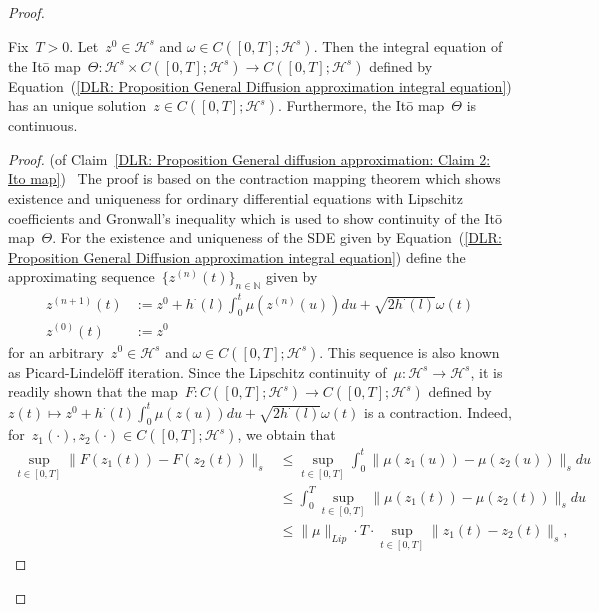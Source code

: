 \begin{proof}
  \begin{claim}
    \label{DLR: Proposition General diffusion approximation: Claim 2: Ito map}
  Fix~$T>0$. Let~$z^0 \in \mathcal{H}^s$ and $\omega \in C([0,T];\mathcal{H}^s)$. Then the integral equation of the It\={o} map~$\Theta : \mathcal{H}^s \times C([0,T]; \mathcal{H}^s) \to  C([0,T]; \mathcal{H}^s)$ defined by Equation~(\ref{DLR: Proposition General Diffusion approximation integral equation}) has an unique solution~$z \in C([0,T];\mathcal{H}^s)$. Furthermore, the It\={o} map~$\Theta$ is continuous.
  \end{claim}
  
  \begin{proof} (of Claim~\ref{DLR: Proposition General diffusion approximation: Claim 2: Ito map})~\autocite[Lemma 3.7]{Mattingly2010}
    The proof is based on the contraction mapping theorem which shows existence and uniqueness for ordinary differential equations with Lipschitz coefficients and Gronwall's inequality which is used to show continuity of the It\={o} map~$\Theta$. For the existence and uniqueness of the SDE given by Equation~(\ref{DLR: Proposition General Diffusion approximation integral equation}) define the approximating sequence~$\{ z^{(n)}(t) \}_{n \in \mathbb{N}} $ given by
    \begin{equation}
      \begin{split}
       z^{(n+1)}(t) & := z^0 + h^{\cdot}(l) \int_0^t \mu (z^{(n)}(u)) du + \sqrt{2 h^{\cdot}(l)} \omega(t) \\
       z^{(0)}(t) & := z^0
      \end{split}
    \end{equation}
    for an arbitrary~$z^0 \in \mathcal{H}^s$ and $\omega \in C([0,T];\mathcal{H}^s)$. This sequence is also known as Picard-Lindel\"{o}ff iteration. Since the Lipschitz continuity of~$\mu: \mathcal{H}^s \to \mathcal{H}^s$, it is readily shown that the map~$F: C([0,T];\mathcal{H}^s) \to C([0,T];\mathcal{H}^s)$ defined by~$z(t) \mapsto z^0 + h^{\cdot}(l) \int_0^t \mu (z(u)) du + \sqrt{2 h^{\cdot}(l)} \omega(t)$ is a contraction. Indeed, for~$z_1(\cdot), z_2(\cdot) \in C([0,T];\mathcal{H}^s)$, we obtain that
    \begin{align*}
      \sup_{t \in [0,T]} \| F(z_1(t)) - F(z_2(t)) \|_{s} & \leq \sup_{t \in [0,T]} \int_0^t \| \mu(z_1(u)) - \mu(z_2(u)) \|_{s} du \\
      & \leq \int_0^T \sup_{t \in [0,T]} \| \mu(z_1(t)) - \mu(z_2(t)) \|_{s} du \\
      & \leq \| \mu \|_{Lip} \cdot T \cdot \sup_{t \in [0,T]} \| z_1(t) - z_2(t) \|_{s},

\end{align*}
\end{proof}
\end{proof}
